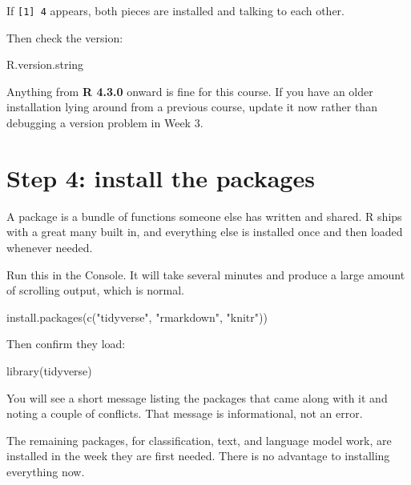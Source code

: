 \documentclass[
  a4paper,
]{scrbook}
\newenvironment{Shaded}{\begin{snugshade}}{\end{snugshade}}
\newcommand{\FunctionTok}[1]{\textcolor[rgb]{0.28,0.35,0.67}{#1}}
\newcommand{\NormalTok}[1]{\textcolor[rgb]{0.00,0.23,0.31}{#1}}
\newcommand{\StringTok}[1]{\textcolor[rgb]{0.13,0.47,0.30}{#1}}
\begin{document}
If \texttt{{[}1{]}\ 4} appears, both pieces are installed and talking to
each other.

Then check the version:

\begin{Shaded}
\begin{Highlighting}[]
\NormalTok{R.version.string}
\end{Highlighting}
\end{Shaded}

Anything from \textbf{R 4.3.0} onward is fine for this course. If you
have an older installation lying around from a previous course, update
it now rather than debugging a version problem in Week 3.

\section*{Step 4: install the
packages}\label{step-4-install-the-packages}


A package is a bundle of functions someone else has written and shared.
R ships with a great many built in, and everything else is installed
once and then loaded whenever needed.

Run this in the Console. It will take several minutes and produce a
large amount of scrolling output, which is normal.

\begin{Shaded}
\begin{Highlighting}[]
\FunctionTok{install.packages}\NormalTok{(}\FunctionTok{c}\NormalTok{(}\StringTok{"tidyverse"}\NormalTok{, }\StringTok{"rmarkdown"}\NormalTok{, }\StringTok{"knitr"}\NormalTok{))}
\end{Highlighting}
\end{Shaded}

Then confirm they load:

\begin{Shaded}
\begin{Highlighting}[]
\FunctionTok{library}\NormalTok{(tidyverse)}
\end{Highlighting}
\end{Shaded}

You will see a short message listing the packages that came along with
it and noting a couple of conflicts. That message is informational, not
an error.

The remaining packages, for classification, text, and language model
work, are installed in the week they are first needed. There is no
advantage to installing everything now.
\end{document}
